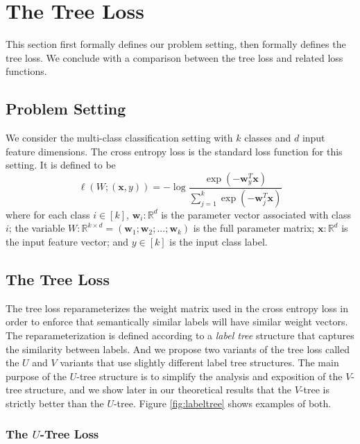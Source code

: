\documentclass[twoside]{article}
\newcommand{\R}{\mathbb R}
\newcommand{\trans}[1]{{#1}^{T}}
\newcommand{\w}{\mathbf w}
\newcommand{\x}{\mathbf x}
\begin{document}
\section{The Tree Loss}
\label{sec:tree}

This section first formally defines our problem setting,
then formally defines the tree loss.
We conclude with a comparison between the tree loss and related loss functions.

\subsection{Problem Setting}

We consider the multi-class classification setting with $k$ classes and $d$ input feature dimensions.
The cross entropy loss is the standard loss function for this setting.
It is defined to be
\begin{equation}
    \label{eq:xentropy}
    \ell(W;(\x,y)) = - \log \frac {\exp(-\trans\w_y \x)}{\sum_{j=1}^k \exp(-\trans \w_j \x)}
\end{equation}
where for each class $i\in[k]$,
$\w_i : \R^d$ is the parameter vector associated with class $i$;
the variable $W : \R^{k \times d} = (\w_1; \w_2; ...; \w_k)$ is the full parameter matrix;
$\x : \R^d$ is the input feature vector;
and $y \in [k]$ is the input class label.

\subsection{The Tree Loss}

The tree loss reparameterizes the weight matrix used in the cross entropy loss in order to enforce that semantically similar labels will have similar weight vectors.
The reparameterization is defined according to a \emph{label tree} structure that captures the similarity between labels.
And we propose two variants of the tree loss called the $U$ and $V$ variants that use slightly different label tree structures.
The main purpose of the $U$-tree structure is to simplify the analysis and exposition of the $V$-tree structure,
and we show later in our theoretical results that the $V$-tree is strictly better than the $U$-tree.
Figure \ref{fig:labeltree} shows examples of both.

\subsubsection{The $U$-Tree Loss}
\end{document}
